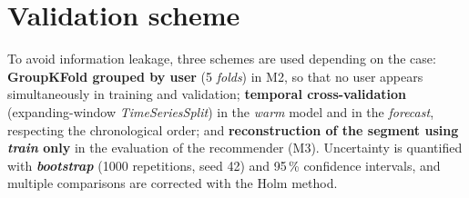 \section{Validation scheme}

To avoid information leakage, three schemes are used depending on the case: \textbf{GroupKFold grouped by user} (5 \textit{folds}) in M2, so that no user appears simultaneously in training and validation; \textbf{temporal cross-validation} (expanding-window \textit{TimeSeriesSplit}) in the \textit{warm} model and in the \textit{forecast}, respecting the chronological order; and \textbf{reconstruction of the segment using \textit{train} only} in the evaluation of the recommender (M3). Uncertainty is quantified with \textbf{\textit{bootstrap}} (1000 repetitions, seed 42) and 95\,\% confidence intervals, and multiple comparisons are corrected with the Holm method.
